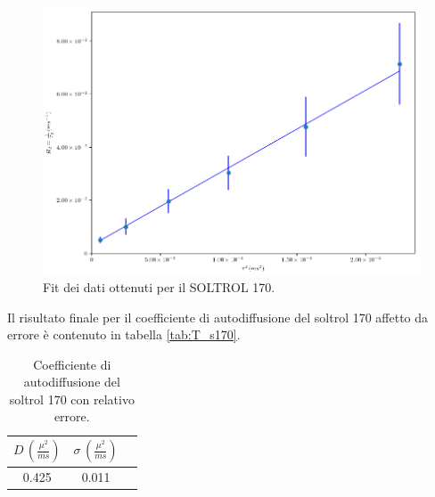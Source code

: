 \begin{figure}[p]
\centering
\includegraphics[width=\columnwidth]{Figure/SOLTROL170_calc.png}
\caption{Fit dei dati ottenuti per il SOLTROL 170.}
\label{fig:Df_s170}
\end{figure}
\newpage
Il risultato finale per il coefficiente di autodiffusione del soltrol 170 affetto da errore è contenuto in tabella \ref{tab:T_s170}. 
\begin{table}
    \begin{center}
    \begin{tabular}{c c c}
    \toprule
    	$D\,(\frac{{\mu}^2}{ms})$ & $\sigma\,(\frac{{\mu}^2}{ms})$ \\
    \midrule
    	0.425	&	0.011	\\
    \bottomrule
    \end{tabular}
    \caption{Coefficiente di autodiffusione del soltrol 170 con relativo errore.}
    \label{tab:Df_s170}
    \end{center}
\end{table}




